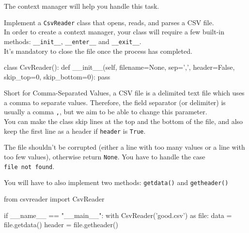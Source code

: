 \documentclass[]{article}
\newenvironment{Shaded}{\begin{snugshade}}{\end{snugshade}}
\newcommand{\BuiltInTok}[1]{\textcolor[rgb]{0.50,0.55,0.55}{#1}}
\newcommand{\ControlFlowTok}[1]{\textcolor[rgb]{0.99,0.74,0.29}{#1}}
\newcommand{\DecValTok}[1]{\textcolor[rgb]{0.96,0.45,0.00}{#1}}
\newcommand{\FunctionTok}[1]{\textcolor[rgb]{0.56,0.27,0.68}{#1}}
\newcommand{\ImportTok}[1]{\textcolor[rgb]{0.15,0.68,0.38}{#1}}
\newcommand{\KeywordTok}[1]{\textcolor[rgb]{0.81,0.81,0.76}{#1}}
\newcommand{\NormalTok}[1]{\textcolor[rgb]{0.81,0.81,0.76}{#1}}
\newcommand{\OperatorTok}[1]{\textcolor[rgb]{0.81,0.81,0.76}{#1}}
\newcommand{\StringTok}[1]{\textcolor[rgb]{0.96,0.31,0.31}{#1}}
\newcommand{\VariableTok}[1]{\textcolor[rgb]{0.15,0.68,0.68}{#1}}
\begin{document}
The context manager will help you handle this task.

Implement a \texttt{CsvReader} class that opens, reads, and parses a CSV
file.\\
In order to create a context manager, your class will require a few
built-in methods: \texttt{\_\_init\_\_}, \texttt{\_\_enter\_\_} and
\texttt{\_\_exit\_\_}.\\
It's mandatory to close the file once the process has completed.

\begin{Shaded}
\begin{Highlighting}[]
\KeywordTok{class}\NormalTok{ CsvReader():}
    \KeywordTok{def} \FunctionTok{__init__}\NormalTok{(}\VariableTok{self}\NormalTok{, filename}\OperatorTok{=}\VariableTok{None}\NormalTok{, sep}\OperatorTok{=}\StringTok{','}\NormalTok{, header}\OperatorTok{=}\VariableTok{False}\NormalTok{, skip_top}\OperatorTok{=}\DecValTok{0}\NormalTok{, skip_bottom}\OperatorTok{=}\DecValTok{0}\NormalTok{):}
        \ControlFlowTok{pass}
\end{Highlighting}
\end{Shaded}

Short for Comma-Separated Values, a CSV file is a delimited text file
which uses a comma to separate values. Therefore, the field separator
(or delimiter) is usually a comma \texttt{,}, but we aim to be able to
change this parameter.\\
You can make the class skip lines at the top and the bottom of the file,
and also keep the first line as a header if \texttt{header} is
\texttt{True}.

The file shouldn't be corrupted (either a line with too many values or a
line with too few values), otherwise return \texttt{None}. You have to
handle the case \texttt{file\ not\ found}.

You will have to also implement two methods: \texttt{getdata()} and
\texttt{getheader()}

\begin{Shaded}
\begin{Highlighting}[]
\ImportTok{from}\NormalTok{ csvreader }\ImportTok{import}\NormalTok{ CsvReader}

\ControlFlowTok{if} \VariableTok{__name__} \OperatorTok{==} \StringTok{"__main__"}\NormalTok{:}
    \ControlFlowTok{with}\NormalTok{ CsvReader(}\StringTok{'good.csv'}\NormalTok{) }\ImportTok{as} \BuiltInTok{file}\NormalTok{:}
\NormalTok{        data }\OperatorTok{=} \BuiltInTok{file}\NormalTok{.getdata()}
\NormalTok{        header }\OperatorTok{=} \BuiltInTok{file}\NormalTok{.getheader()}
\end{Highlighting}
\end{Shaded}
\end{document}
